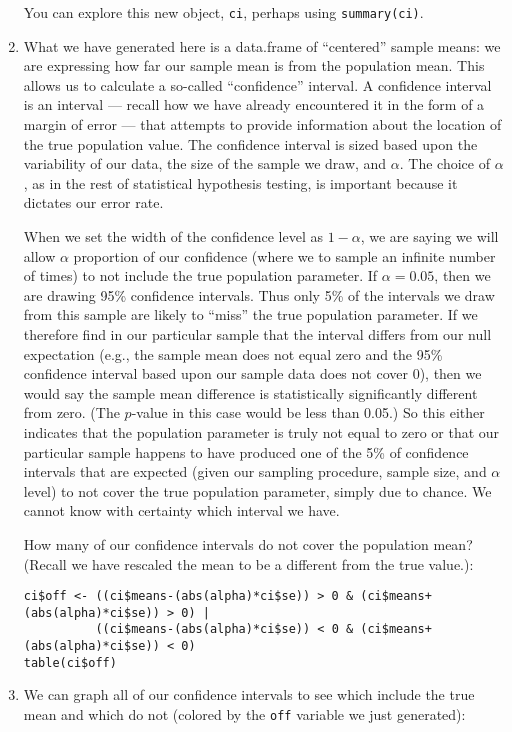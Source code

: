 \documentclass[a4paper,12pt]{article}
\begin{document}
\begin{enumerate}
\noindent You can explore this new object, \texttt{ci}, perhaps using \texttt{summary(ci)}.

\item What we have generated here is a data.frame of ``centered'' sample means: we are expressing how far our sample mean is from the population mean. This allows us to calculate a so-called ``confidence'' interval. A confidence interval is an interval --- recall how we have already encountered it in the form of a margin of error --- that attempts to provide information about the location of the true population value. The confidence interval is sized based upon the variability of our data, the size of the sample we draw, and $\alpha$. The choice of $\alpha$, as in the rest of statistical hypothesis testing, is important because it dictates our error rate. 

When we set the width of the confidence level as $1-\alpha$, we are saying we will allow $\alpha$ proportion of our confidence (where we to sample an infinite number of times) to not include the true population parameter. If $\alpha = 0.05$, then we are drawing 95\% confidence intervals. Thus only 5\% of the intervals we draw from this sample are likely to ``miss'' the true population parameter. If we therefore find in our particular sample that the interval differs from our null expectation (e.g., the sample mean does not equal zero and the 95\% confidence interval based upon our sample data does not cover 0), then we would say the sample mean difference is statistically significantly different from zero. (The $p$-value in this case would be less than 0.05.) So this either indicates that the population parameter is truly not equal to zero or that our particular sample happens to have produced one of the 5\% of confidence intervals that are expected (given our sampling procedure, sample size, and $\alpha$ level) to not cover the true population parameter, simply due to chance. We cannot know with certainty which interval we have.

How many of our confidence intervals do not cover the population mean? (Recall we have rescaled the mean to be a different from the true value.):

\begin{verbatim}
ci$off <- ((ci$means-(abs(alpha)*ci$se)) > 0 & (ci$means+(abs(alpha)*ci$se)) > 0) | 
          ((ci$means-(abs(alpha)*ci$se)) < 0 & (ci$means+(abs(alpha)*ci$se)) < 0)
table(ci$off)
\end{verbatim}
 
\item We can graph all of our confidence intervals to see which include the true mean and which do not (colored by the \texttt{off} variable we just generated):


\end{enumerate}
\end{document}
